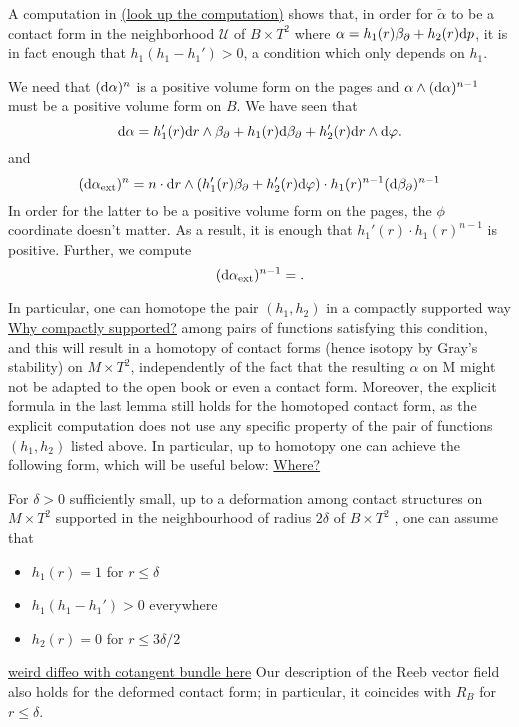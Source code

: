 A computation in \cite{Bourgeois02} \underline{(look up the computation)}
shows that, in order for $\tilde \alpha$ to be a contact form in the neighborhood $\mathcal{U}$ of $B \times T^2$ where 
$\alpha = h_1(r) \beta_\partial + h_2(r) \mathrm{d} p$, it is in fact enough that $h_1(h_1 - h_1') > 0$, a condition which only depends on $h_1$.

We need that $(\mathrm{d} \alpha)^n$ is a positive volume form on the pages and
$\alpha \wedge (\mathrm{d} \alpha)^{n-1}$ must be a positive volume form on $B$.
We have seen that
\[
    \mathrm{d} \alpha = h_1'(r)\mathrm{d} r\wedge \beta_\partial + h_1(r) \mathrm{d} \beta_\partial + h_2'(r) \mathrm{d} r \wedge \mathrm{d}\varphi.
\]
and 
\[
    (\mathrm{d} \alpha_\text{ext})^n = n\cdot \mathrm{d} r\wedge (h_1'(r) \beta_\partial + h_2'(r) \mathrm{d}\varphi) \cdot h_1(r)^{n-1}(\mathrm{d} \beta_\partial)^{n-1}
\]
In order for the latter to be a positive volume form on the pages, the $\phi$ coordinate doesn't matter. As a result, it is enough that $h_1'(r) \cdot h_1(r)^{n-1}$ is positive.
Further, we compute
\[
    (\mathrm{d} \alpha_\text{ext})^{n-1} = .
\]

In particular, one can homotope the pair $(h_1 , h_2)$ in a compactly supported way \underline{Why compactly supported?} among pairs of functions satisfying this condition, 
and this will result in a homotopy of contact forms (hence isotopy by Gray's stability) on $M \times T^2$, 
independently of the fact that the resulting $\alpha$ on M might not be adapted to the open book or even a contact form. 
Moreover, the explicit formula in the last lemma still holds for the homotoped contact form, as the explicit computation does not use any specific property of the pair of functions $(h_1, h_2)$ listed above.
In particular, up to homotopy one can achieve the following form, which
will be useful below: \underline{Where?}
\begin{lemma}
    For $\delta > 0$ sufficiently small, up to a deformation among contact structures on $M\times T^2$ supported in the neighbourhood of radius $2\delta$ of $B \times T^2$ , one can assume that
    \begin{itemize}
        \item $h_1(r) = 1$ for $r \le \delta$
        \item $h_1(h_1 - h_1') > 0$ everywhere
        \item $h_2(r) = 0$ for $r \le 3\delta/2$ 
    \end{itemize}
    \underline{weird diffeo with cotangent bundle here}
    Our description of the Reeb vector field also holds for the deformed contact form; in particular, it coincides with $R_B$ for $r\le \delta$.
\end{lemma}